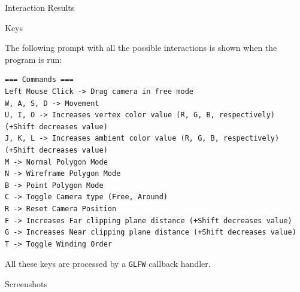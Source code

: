 \documentclass{article}
\begin{document}
\begin{section}{Interaction Results}
  \begin{subsection}{Keys}

    The following prompt with all the possible interactions is shown when the program is run:

  \begin{verbatim}    
=== Commands ===
Left Mouse Click -> Drag camera in free mode
W, A, S, D -> Movement  
U, I, O -> Increases vertex color value (R, G, B, respectively) (+Shift decreases value)  
J, K, L -> Increases ambient color value (R, G, B, respectively) (+Shift decreases value)  
M -> Normal Polygon Mode  
N -> Wireframe Polygon Mode  
B -> Point Polygon Mode  
C -> Toggle Camera type (Free, Around)  
R -> Reset Camera Position  
F -> Increases Far clipping plane distance (+Shift decreases value)  
G -> Increases Near clipping plane distance (+Shift decreases value)  
T -> Toggle Winding Order
  \end{verbatim}

  All these keys are processed by a \texttt{GLFW} callback handler.

  \end{subsection}

\newpage
  \begin{multicols}{2}

  \begin{subsection}{Screenshots}


\end{subsection}
\end{multicols}
\end{section}
\end{document}
